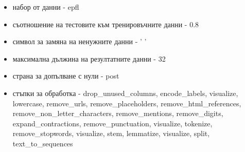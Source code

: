 \documentclass{article}
\begin{document}
\begin{itemize}
  \begin{itemize}
    \item набор от данни - epfl
    \item съотношение на тестовите към тренировъчните данни - 0.8
    \item символ за замяна на ненужните данни - ' '
    \item максимална дължина на резултатните данни - 32
    \item страна за допълване с нули - post
    \item стъпки за обработка - drop\_unused\_columns, encode\_labels, visualize, lowercase, remove\_urls,
    remove\_placeholders, remove\_html\_references, remove\_non\_letter\_characters, remove\_mentions,
    remove\_digits, expand\_contractions, remove\_punctuation, visualize, tokenize, remove\_stopwords, visualize,
    stem, lemmatize, visualize, split, text\_to\_sequences
  \end{itemize}


\end{itemize}
\end{document}
